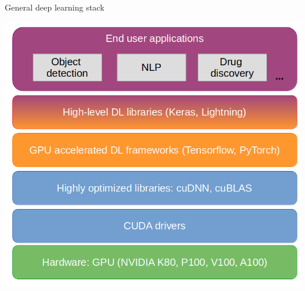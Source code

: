 \documentclass[usenames,dvipsnames]{beamer}
\begin{document}
    \begin{frame}{\secname}{\subsecname}
        General deep learning stack
        \begin{center}
            \includegraphics[width=0.7\linewidth]{figures/DL_fundamentals/DL_stack.png}
        \end{center}
    \end{frame}
    
\end{document}
